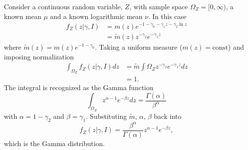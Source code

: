 \begin{example}
	Consider a continuous random variable, $Z$, with sample space $\Omega_Z= [0,\infty)$, a known mean $\mu$ and a known logarithmic mean $\nu$. In this case
	\begin{equation}
		\begin{split}
			f_Z(z|\gamma,I)&= m(z) e^{-1-\gamma_0 - \gamma_1 z - \gamma_2 \ln z}\\
			& = \tilde{m}(z)  z^{-\gamma_2} e^{-\gamma_1 z}
		\end{split}
		\label{eq:gam1}
	\end{equation}
	where $\tilde{m}(z) = m(z) e^{-1-\gamma_0}$. Taking a uniform measure ($m(z) = \text{const}$) and imposing normalization
	\begin{equation}
		\begin{split}
			\int_{\Omega_Z} f_Z(z|\gamma,I) dz &= \tilde{m} \int{\Omega_Z} z^{-\gamma_2} e^{-\gamma_1 z} dz\\
			& = 1.
		\end{split}
	\end{equation}
	The integral is recognized as the Gamma function
	\begin{equation}
		\int_{\Omega_Z} z^{\alpha-1}  e^{-\beta z} dz = \frac{\Gamma(\alpha)}{\beta^\alpha}
	\end{equation}
	with $\alpha = 1 - \gamma_2$ and $\beta = \gamma_1$. Substituting $\tilde{m}$, $\alpha$, $\beta$ back into 
	\begin{equation}
		f_Z(z|\gamma,I) = \frac{\beta^\alpha}{\Gamma(\alpha)} z^{\alpha-1} e^{-\beta z},
	\end{equation}
	which is the Gamma distribution.
\end{example}

